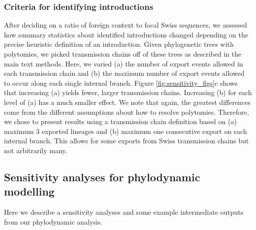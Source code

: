 \documentclass[9pt,twoside,lineno]{pnas-new}
\begin{document}
\subsubsection{Criteria for identifying introductions}
After deciding on a ratio of foreign context to focal Swiss sequences, we assessed how summary statistics about identified introductions changed depending on the precise heuristic definition of an introduction. Given phylogenetic trees with polytomies, we picked transmission chains off of these trees as described in the main text methods. Here, we varied (a) the number of export events allowed in each transmission chain and (b) the maximum number of export events allowed to occur along each single internal branch. Figure \ref{fig:sensitivity_figs}c shows that increasing (a) yields fewer, larger transmission chains. Increasing (b) for each level of (a) has a much smaller effect. We note that again, the greatest differences come from the different assumptions about how to resolve polytomies. Therefore, we chose to present results using a transmission chain definition based on (a) maximum 3 exported lineages and (b) maximum one consecutive export on each internal branch. This allows for some exports from Swiss transmission chains but not arbitrarily many. 

\subsection{Sensitivity analyses for phylodynamic modelling}
Here we describe a sensitivity analyses and some example intermediate outputs from our phylodynamic analysis.
\end{document}
